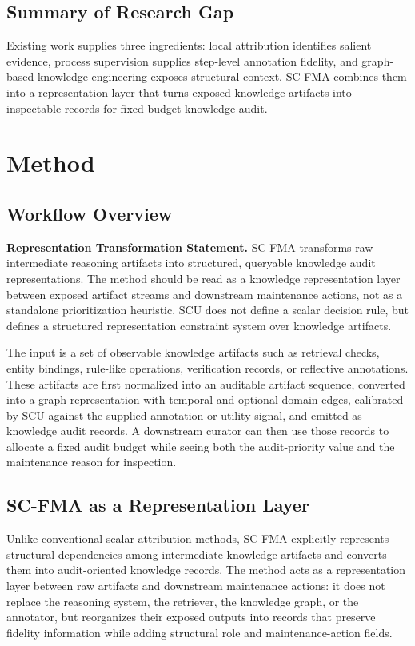 \documentclass[a4paper,fleqn]{cas-sc}
\begin{document}
\subsection{Summary of Research Gap}

Existing work supplies three ingredients: local attribution identifies salient evidence, process supervision supplies step-level annotation fidelity, and graph-based knowledge engineering exposes structural context. SC-FMA combines them into a representation layer that turns exposed knowledge artifacts into inspectable records for fixed-budget knowledge audit.

\section{Method}
\label{sec:methods}

\subsection{Workflow Overview}

\textbf{Representation Transformation Statement.} SC-FMA transforms raw intermediate reasoning artifacts into structured, queryable knowledge audit representations. The method should be read as a knowledge representation layer between exposed artifact streams and downstream maintenance actions, not as a standalone prioritization heuristic. SCU does not define a scalar decision rule, but defines a structured representation constraint system over knowledge artifacts.

The input is a set of observable knowledge artifacts such as retrieval checks, entity bindings, rule-like operations, verification records, or reflective annotations. These artifacts are first normalized into an auditable artifact sequence, converted into a graph representation with temporal and optional domain edges, calibrated by SCU against the supplied annotation or utility signal, and emitted as knowledge audit records. A downstream curator can then use those records to allocate a fixed audit budget while seeing both the audit-priority value and the maintenance reason for inspection.

\subsection{SC-FMA as a Representation Layer}

Unlike conventional scalar attribution methods, SC-FMA explicitly represents structural dependencies among intermediate knowledge artifacts and converts them into audit-oriented knowledge records. The method acts as a representation layer between raw artifacts and downstream maintenance actions: it does not replace the reasoning system, the retriever, the knowledge graph, or the annotator, but reorganizes their exposed outputs into records that preserve fidelity information while adding structural role and maintenance-action fields.
\end{document}
